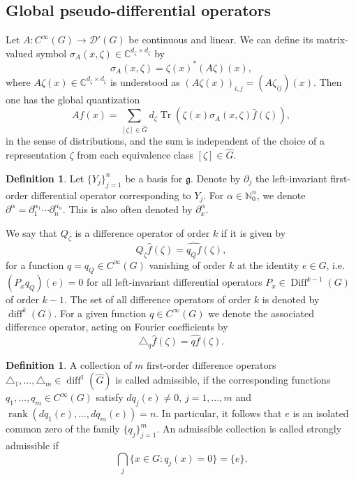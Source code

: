 \documentclass[12pt, reqno]{amsart}
\theoremstyle{definition}
\newtheorem{definition}[theorem]{Definition}
\theoremstyle{remark}
\numberwithin{equation}{section}
\begin{document}
\subsection{Global pseudo-differential operators}
Let $A\colon C^{\infty}(G)\to\mathcal{D}'(G)$ be continuous and linear. We can define its matrix-valued symbol $\sigma_A(x,\zeta)\in\mathbb{C}^{d_\zeta\times d_\zeta}$ by
\begin{equation*}
    \sigma_A(x,\zeta)=\zeta(x)^*(A\zeta)(x),
\end{equation*}
 where $A\zeta(x)\in\mathbb{C}^{d_\zeta\times d_\zeta}$ is understood as $(A\zeta(x))_{i,j}=(A\zeta_{ij})(x)$. Then one has the global quantization
 \begin{equation*}
        Af(x)=\sum_{[\zeta]\in\widehat{G}}d_\zeta\operatorname{Tr}(\zeta(x)\sigma_A(x,\zeta)\widehat{f}(\zeta)),
    \end{equation*}
in the sense of distributions, and the sum is independent of the choice of a representation $\zeta$ from each equivalence class $[\zeta]\in\widehat{G}$.
\begin{definition}
     Let $\{Y_j\}_{j=1}^{n}$ be a basis for $\mathfrak{g}$. Denote by $\partial_j$ the left-invariant first-order differential operator corresponding to $Y_j$. For $\alpha\in\mathbb{N}_{0}^{n}$, we denote $\partial^\alpha=\partial^{\alpha_1}_{1}\cdots\partial^{\alpha_n}_{n}$. This is also often denoted by $\partial_x^\alpha$.
\end{definition}
 We say that $Q_\zeta$ is a difference operator of order $k$ if it is given by
 \begin{equation*}
     Q_\zeta\widehat{f}(\zeta)=\widehat{q_Qf}(\zeta),
 \end{equation*}
 for a function $q=q_Q\in C^{\infty}(G)$  vanishing of order $k$ at the identity $e\in G$, i.e. $(P_xq_Q)(e)=0$ for all left-invariant differential operators $P_x\in\operatorname{Diff}^{k-1}(G)$ of order $k-1$. The set of all difference operators of order $k$ is denoted by $\operatorname{diff}^k(G)$. For a given function $q\in C^{\infty}(G)$ we denote the associated difference operator, acting on Fourier coefficients by
 \begin{equation*}
     \triangle_q\widehat{f}(\zeta)=\widehat{qf}(\zeta).
 \end{equation*}
\begin{definition}
    A collection of $m$ first-order difference operators $\triangle_1,\dots,\triangle_m\in\operatorname{diff}^1(\widehat{G})$ is called admissible, if the corresponding functions $q_1,\dots,q_m\in C^{\infty}(G)$ satisfy $d{q}_j(e)\neq 0$, $j=1,\dots,m$ and $\operatorname{rank}(d{q}_1(e),\dots,d{q}_m(e))=n$. In particular, it follows that $e$ is an isolated common zero of the family $\{q_j\}_{j=1}^{m}$. An admissible collection is called strongly admissible if 
    \begin{equation*}
        \bigcap_{j}\{x\in G: q_j(x)=0\}=\{e\}.
    \end{equation*}
 \end{definition}
\end{document}
